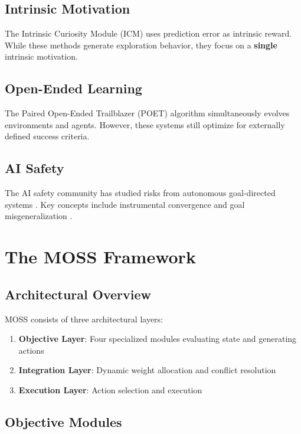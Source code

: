\documentclass[10pt,a4paper]{article}
\begin{document}
\subsection{Intrinsic Motivation}

The Intrinsic Curiosity Module (ICM) \cite{pathak2017curiosity} uses prediction error as intrinsic reward. While these methods generate exploration behavior, they focus on a \textbf{single} intrinsic motivation.

\subsection{Open-Ended Learning}

The Paired Open-Ended Trailblazer (POET) algorithm \cite{wang2019poet} simultaneously evolves environments and agents. However, these systems still optimize for externally defined success criteria.

\subsection{AI Safety}

The AI safety community has studied risks from autonomous goal-directed systems \cite{amodei2016concrete}. Key concepts include instrumental convergence \cite{omohundro2008basic} and goal misgeneralization \cite{shah2022goal}.

\section{The MOSS Framework}

\subsection{Architectural Overview}

MOSS consists of three architectural layers:

\begin{enumerate}
    \item \textbf{Objective Layer}: Four specialized modules evaluating state and generating actions
    \item \textbf{Integration Layer}: Dynamic weight allocation and conflict resolution
    \item \textbf{Execution Layer}: Action selection and execution
\end{enumerate}

\subsection{Objective Modules}
\end{document}
